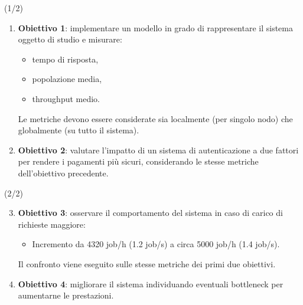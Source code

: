 \begin{frame}{\subsecname (1/2)}
    \begin{enumerate}
        \item \textbf{Obiettivo 1}: implementare un modello in grado di rappresentare il sistema oggetto di studio e misurare:
        \begin{itemize}
            \item tempo di risposta,
            \item popolazione media,
            \item throughput medio.
        \end{itemize}
        Le metriche devono essere considerate sia localmente (per singolo nodo) che globalmente (su tutto il sistema).

        \item \textbf{Obiettivo 2}: valutare l’impatto di un sistema di autenticazione a due fattori per rendere i pagamenti più sicuri, considerando le stesse metriche dell'obiettivo precedente.
    \end{enumerate}
\end{frame}

\begin{frame}{\subsecname (2/2)}
    \begin{enumerate}
        \setcounter{enumi}{2}
        \item \textbf{Obiettivo 3}: osservare il comportamento del sistema in caso di carico di richieste maggiore:
        \begin{itemize}
            \item Incremento da 4320 job/h (1.2 job/s) a circa 5000 job/h (1.4 job/s).
        \end{itemize}
        Il confronto viene eseguito sulle stesse metriche dei primi due obiettivi.

        \item \textbf{Obiettivo 4}: migliorare il sistema individuando eventuali bottleneck per aumentarne le prestazioni.
    \end{enumerate}
\end{frame}